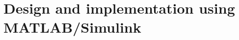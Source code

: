 \section{Design and implementation using MATLAB/Simulink}\label{chapter_DESIGN_AND_IMPL}

\pagestyle{fancy}


\pagestyle{fancy}


\pagestyle{fancy}


\pagestyle{fancy}


\pagestyle{fancy}


\pagestyle{fancy}

